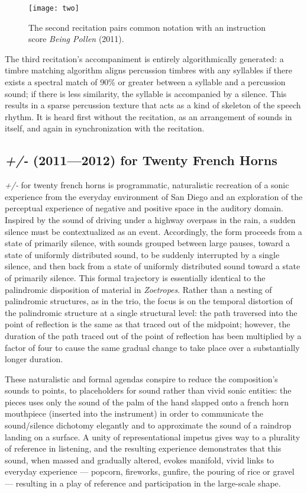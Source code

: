 \begin{figure}[H] 
\texttt{[image: two]}
\caption{The second recitation pairs common notation with an instruction score \emph{Being Pollen} (2011). }
\end{figure} 

The third recitation's accompaniment is entirely algorithmically generated: a timbre matching algorithm aligns percussion timbres with any syllables if there exists a spectral match of 90\% or greater between a syllable and a percussion sound; if there is less similarity, the syllable is accompanied by a silence. This results in a sparse percussion texture that acts as a kind of skeleton of the speech rhythm. It is heard first without the recitation, as an arrangement of sounds in itself, and again in synchronization with the recitation. 

\subsection{\emph{+/-} (2011---2012) for Twenty French Horns}
\emph{+/-} for twenty french horns is programmatic, naturalistic recreation of a sonic experience from the everyday environment of San Diego and an exploration of the perceptual experience of negative and positive space in the auditory domain. Inspired by the sound of driving under a highway overpass in the rain, a sudden silence must be contextualized as an event. Accordingly, the form proceeds from a state of primarily silence, with sounds grouped between large pauses, toward a state of uniformly distributed sound, to be suddenly interrupted by a single silence, and then back from a state of uniformly distributed sound toward a state of primarily silence. This formal trajectory is essentially identical to the palindromic disposition of material in \emph{Zoetropes}. Rather than a nesting of palindromic structures, as in the trio, the focus is on the temporal distortion of the palindromic structure at a single structural level: the path traversed into the point of reflection is the same as that traced out of the midpoint; however, the duration of the path traced out of the point of reflection has been multiplied by a factor of four to cause the same gradual change to take place over a substantially longer duration.

These naturalistic and formal agendas conspire to reduce the composition's sounds to points, to placeholders for sound rather than vivid sonic entities: the pieces uses only the sound of the palm of the hand slapped onto a french horn mouthpiece (inserted into the instrument) in order to communicate the sound/silence dichotomy elegantly and to approximate the sound of a raindrop landing on a surface. A unity of representational impetus gives way to a plurality of reference in listening, and the resulting experience demonstrates that this sound, when massed and gradually altered, evokes manifold, vivid links to everyday experience --- popcorn, fireworks, gunfire, the pouring of rice or gravel --- resulting in a play of reference and participation in the large-scale shape.

